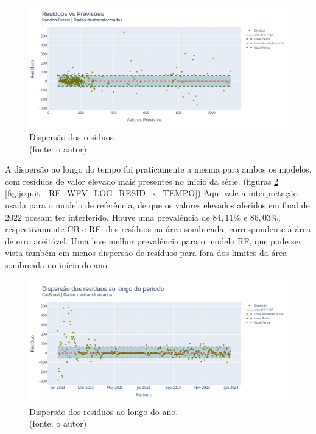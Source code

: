 \begin{figure}[!h]
\centering
\includegraphics[scale=0.33]{Figuras/jequiti/resultados/RF_WFV_LOG_RESID_x_PREV.png}
\caption{Dispersão dos resíduos.\\(fonte: o autor)}
\label{fig:jequiti_RF_WFV_LOG_RESID_x_PREV}
\end{figure}
\clearpage

A dispersão ao longo do tempo foi praticamente a mesma para ambos os modelos, com resíduos de valor elevado mais presentes no início da série. (figuras \ref{fig:jequiti_CB_WFV_LOG_RESID_x_TEMPO} \ref{fig:jequiti_RF_WFV_LOG_RESID_x_TEMPO}) Aqui vale a interpretação usada para o modelo de referência, de que os valores elevados aferidos em final de 2022 possam ter interferido. Houve uma prevalência de $84,11\%$ e $86,03\%$, respectivamente CB e RF, dos resíduos na área sombreada, correspondente à área de erro aceitável. Uma leve melhor prevalência para o modelo RF, que pode ser vista também em menos dispersão de resíduos para fora dos limites da área sombreada no início do ano.

\begin{figure}[!h]
\centering
\includegraphics[scale=0.33]{Figuras/jequiti/resultados/CB_WFV_LOG_RESID_x_TEMPO.png}
\caption{Dispersão dos resíduos ao longo do ano.\\(fonte: o autor)}
\label{fig:jequiti_CB_WFV_LOG_RESID_x_TEMPO}
\end{figure}

